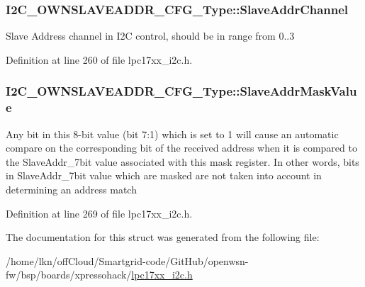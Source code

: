\subsubsection[{\texorpdfstring{Slave\+Addr\+Channel}{SlaveAddrChannel}}]{ I2\+C\+\_\+\+O\+W\+N\+S\+L\+A\+V\+E\+A\+D\+D\+R\+\_\+\+C\+F\+G\+\_\+\+Type\+::\+Slave\+Addr\+Channel}\hypertarget{struct_i2_c___o_w_n_s_l_a_v_e_a_d_d_r___c_f_g___type_a837b455a7cd6e12fc75175e4a3eebe7d}{}\label{struct_i2_c___o_w_n_s_l_a_v_e_a_d_d_r___c_f_g___type_a837b455a7cd6e12fc75175e4a3eebe7d}
Slave Address channel in I2C control, should be in range from 0..3 

Definition at line 260 of file lpc17xx\+\_\+i2c.\+h.

\subsubsection[{\texorpdfstring{Slave\+Addr\+Mask\+Value}{SlaveAddrMaskValue}}]{ I2\+C\+\_\+\+O\+W\+N\+S\+L\+A\+V\+E\+A\+D\+D\+R\+\_\+\+C\+F\+G\+\_\+\+Type\+::\+Slave\+Addr\+Mask\+Value}\hypertarget{struct_i2_c___o_w_n_s_l_a_v_e_a_d_d_r___c_f_g___type_ad7ade56e1eca1d7c2206ea2c81d2e9f6}{}\label{struct_i2_c___o_w_n_s_l_a_v_e_a_d_d_r___c_f_g___type_ad7ade56e1eca1d7c2206ea2c81d2e9f6}
Any bit in this 8-\/bit value (bit 7\+:1) which is set to \textquotesingle{}1\textquotesingle{} will cause an automatic compare on the corresponding bit of the received address when it is compared to the Slave\+Addr\+\_\+7bit value associated with this mask register. In other words, bits in Slave\+Addr\+\_\+7bit value which are masked are not taken into account in determining an address match 

Definition at line 269 of file lpc17xx\+\_\+i2c.\+h.



The documentation for this struct was generated from the following file\+:\begin{DoxyCompactItemize}
\item 
/home/lkn/off\+Cloud/\+Smartgrid-\/code/\+Git\+Hub/openwsn-\/fw/bsp/boards/xpressohack/\hyperlink{lpc17xx__i2c_8h}{lpc17xx\+\_\+i2c.\+h}\end{DoxyCompactItemize}
